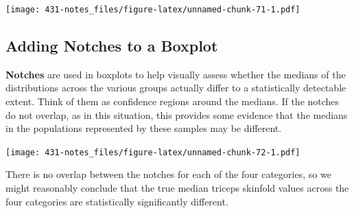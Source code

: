 \documentclass[
]{book}
\newenvironment{Shaded}{\begin{snugshade}}{\end{snugshade}}
\newcommand{\DataTypeTok}[1]{\textcolor[rgb]{0.13,0.29,0.53}{#1}}
\newcommand{\FloatTok}[1]{\textcolor[rgb]{0.00,0.00,0.81}{#1}}
\newcommand{\KeywordTok}[1]{\textcolor[rgb]{0.13,0.29,0.53}{\textbf{#1}}}
\newcommand{\NormalTok}[1]{#1}
\newcommand{\OperatorTok}[1]{\textcolor[rgb]{0.81,0.36,0.00}{\textbf{#1}}}
\newcommand{\OtherTok}[1]{\textcolor[rgb]{0.56,0.35,0.01}{#1}}
\newcommand{\StringTok}[1]{\textcolor[rgb]{0.31,0.60,0.02}{#1}}
\begin{document}
\texttt{[image: 431-notes\_files/figure-latex/unnamed-chunk-71-1.pdf]}

\hypertarget{adding-notches-to-a-boxplot}{%
\subsection{Adding Notches to a Boxplot}\label{adding-notches-to-a-boxplot}}

\textbf{Notches} are used in boxplots to help visually assess whether the medians of the distributions across the various groups actually differ to a statistically detectable extent. Think of them as confidence regions around the medians. If the notches do not overlap, as in this situation, this provides some evidence that the medians in the populations represented by these samples may be different.

\begin{Shaded}
\end{Shaded}

\texttt{[image: 431-notes\_files/figure-latex/unnamed-chunk-72-1.pdf]}

There is no overlap between the notches for each of the four categories, so we might reasonably conclude that the true median triceps skinfold values across the four categories are statistically significantly different.
\end{document}
